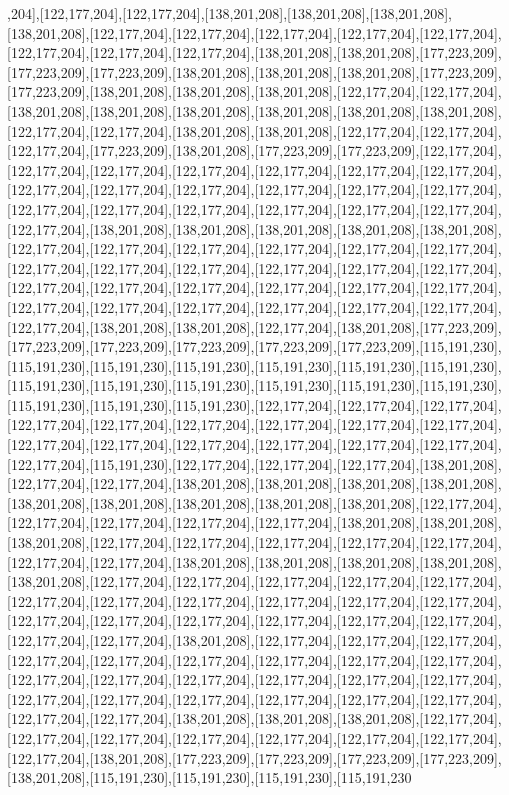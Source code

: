 ,204],[122,177,204],[122,177,204],[138,201,208],[138,201,208],[138,201,208],[138,201,208],[122,177,204],[122,177,204],[122,177,204],[122,177,204],[122,177,204],[122,177,204],[122,177,204],[122,177,204],[138,201,208],[138,201,208],[177,223,209],[177,223,209],[177,223,209],[138,201,208],[138,201,208],[138,201,208],[177,223,209],[177,223,209],[138,201,208],[138,201,208],[138,201,208],[122,177,204],[122,177,204],[138,201,208],[138,201,208],[138,201,208],[138,201,208],[138,201,208],[138,201,208],[122,177,204],[122,177,204],[138,201,208],[138,201,208],[122,177,204],[122,177,204],[122,177,204],[177,223,209],[138,201,208],[177,223,209],[177,223,209],[122,177,204],[122,177,204],[122,177,204],[122,177,204],[122,177,204],[122,177,204],[122,177,204],[122,177,204],[122,177,204],[122,177,204],[122,177,204],[122,177,204],[122,177,204],[122,177,204],[122,177,204],[122,177,204],[122,177,204],[122,177,204],[122,177,204],[122,177,204],[138,201,208],[138,201,208],[138,201,208],[138,201,208],[138,201,208],[122,177,204],[122,177,204],[122,177,204],[122,177,204],[122,177,204],[122,177,204],[122,177,204],[122,177,204],[122,177,204],[122,177,204],[122,177,204],[122,177,204],[122,177,204],[122,177,204],[122,177,204],[122,177,204],[122,177,204],[122,177,204],[122,177,204],[122,177,204],[122,177,204],[122,177,204],[122,177,204],[122,177,204],[122,177,204],[138,201,208],[138,201,208],[122,177,204],[138,201,208],[177,223,209],[177,223,209],[177,223,209],[177,223,209],[177,223,209],[177,223,209],[115,191,230],[115,191,230],[115,191,230],[115,191,230],[115,191,230],[115,191,230],[115,191,230],[115,191,230],[115,191,230],[115,191,230],[115,191,230],[115,191,230],[115,191,230],[115,191,230],[115,191,230],[115,191,230],[122,177,204],[122,177,204],[122,177,204],[122,177,204],[122,177,204],[122,177,204],[122,177,204],[122,177,204],[122,177,204],[122,177,204],[122,177,204],[122,177,204],[122,177,204],[122,177,204],[122,177,204],[122,177,204],[115,191,230],[122,177,204],[122,177,204],[122,177,204],[138,201,208],[122,177,204],[122,177,204],[138,201,208],[138,201,208],[138,201,208],[138,201,208],[138,201,208],[138,201,208],[138,201,208],[138,201,208],[138,201,208],[122,177,204],[122,177,204],[122,177,204],[122,177,204],[122,177,204],[138,201,208],[138,201,208],[138,201,208],[122,177,204],[122,177,204],[122,177,204],[122,177,204],[122,177,204],[122,177,204],[122,177,204],[138,201,208],[138,201,208],[138,201,208],[138,201,208],[138,201,208],[122,177,204],[122,177,204],[122,177,204],[122,177,204],[122,177,204],[122,177,204],[122,177,204],[122,177,204],[122,177,204],[122,177,204],[122,177,204],[122,177,204],[122,177,204],[122,177,204],[122,177,204],[122,177,204],[122,177,204],[122,177,204],[122,177,204],[138,201,208],[122,177,204],[122,177,204],[122,177,204],[122,177,204],[122,177,204],[122,177,204],[122,177,204],[122,177,204],[122,177,204],[122,177,204],[122,177,204],[122,177,204],[122,177,204],[122,177,204],[122,177,204],[122,177,204],[122,177,204],[122,177,204],[122,177,204],[122,177,204],[122,177,204],[122,177,204],[122,177,204],[138,201,208],[138,201,208],[138,201,208],[122,177,204],[122,177,204],[122,177,204],[122,177,204],[122,177,204],[122,177,204],[122,177,204],[122,177,204],[138,201,208],[177,223,209],[177,223,209],[177,223,209],[177,223,209],[138,201,208],[115,191,230],[115,191,230],[115,191,230],[115,191,230